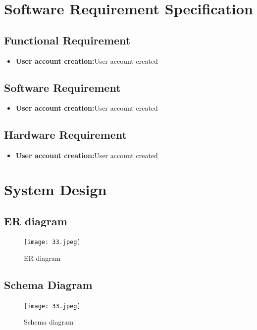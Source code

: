 \documentclass[12pt,a4paper]{report}
\begin{document}
\chapter{Software Requirement Specification}


\section{Functional Requirement}

\begin{itemize}
    \item \textbf{User account creation:}User account created
    
\end{itemize}


\section{Software Requirement }

\begin{itemize}
    \item \textbf{User account creation:}User account created
    
\end{itemize}

 
\section{Hardware Requirement}

\begin{itemize}
    \item \textbf{User account creation:}User account created
    
\end{itemize}

 

\newpage
\chapter{System Design}
\section{ER diagram}
\begin{figure}[htp]
\centering
    \texttt{[image: 33.jpeg]}
  \caption{ER diagram}
  \label{figa2}
\end{figure}

\newpage

\section{Schema Diagram}
\begin{figure}[htp]
\centering
    \texttt{[image: 33.jpeg]}
  \caption{Schema  diagram}
  \label{figa2}
\end{figure}
\newpage
\end{document}
